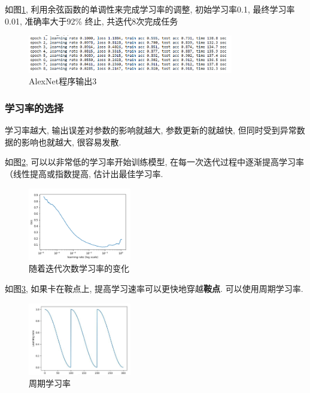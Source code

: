 \documentclass[a4paper]{article}
\theoremstyle{definition}
\numberwithin{equation}{section}
\begin{document}
如图\ref{AlexOutput3}, 利用余弦函数的单调性来完成学习率的调整, 初始学习率0.1, 最终学习率0.01, 准确率大于92\% 终止, 共迭代8次完成任务
\begin{figure}[!ht]
    \center
\includegraphics[width=0.8\textwidth]{alex_output4.png}
\caption{AlexNet程序输出3}
\label{AlexOutput3}

\end{figure}

\subsubsection{学习率的选择}

学习率越大, 输出误差对参数的影响就越大, 参数更新的就越快, 但同时受到异常数据的影响也就越大, 很容易发散. 

如图\ref{lrselect}, 可以以非常低的学习率开始训练模型, 在每一次迭代过程中逐渐提高学习率（线性提高或指数提高, 估计出最佳学习率.  

\begin{figure}[!ht]
    \center
\includegraphics[width=0.4\textwidth]{lrselect.png}
\caption{随着迭代次数学习率的变化}
\label{lrselect}

\end{figure}


如图\ref{cyclelr}, 如果卡在鞍点上, 提高学习速率可以更快地穿越\textbf{鞍点}. 可以使用周期学习率.
\begin{figure}[!ht]
    \center
\includegraphics[width=0.4\textwidth]{cyclelr.png}
\caption{周期学习率}
\label{cyclelr}

\end{figure}
\end{document}
